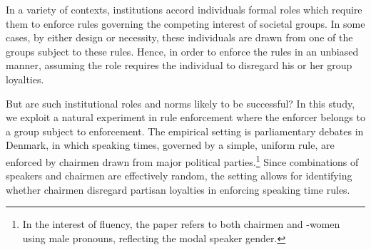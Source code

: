 \documentclass[12pt,a4paper]{article}
\begin{document}
\noindent In a variety of contexts, institutions accord individuals formal roles which require them to enforce rules governing the competing interest of societal groups. In some cases, by either design or necessity, these individuals are drawn from one of the groups subject to these rules. Hence, in order to enforce the rules in an unbiased manner, assuming the role requires the individual to disregard his or her group loyalties. 

But are such institutional roles and norms likely to be successful? In this study, we exploit a natural experiment in rule enforcement where the enforcer belongs to a group subject to enforcement. The empirical setting is parliamentary debates in Denmark, in which speaking times, governed by a simple, uniform rule, are enforced by chairmen drawn from major political parties.\footnote{In the interest of fluency, the paper refers to both chairmen and -women using male pronouns, reflecting the modal speaker gender.} Since combinations of speakers and chairmen are effectively random, the setting allows for identifying whether chairmen disregard partisan loyalties in enforcing speaking time rules.


\end{document}
